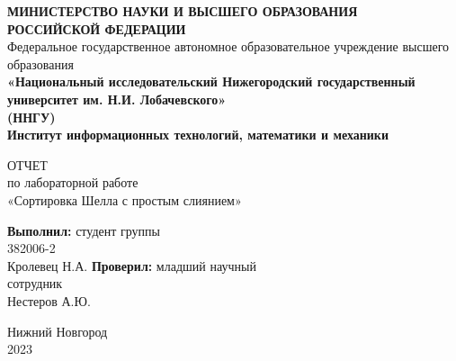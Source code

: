 \documentclass[14pt, a4paper]{extarticle}
\title{}
\author{}
\date{}
\begin{document}
	\begin{titlepage}
		\begin{center}
			{\bfseries МИНИСТЕРСТВО НАУКИ И ВЫСШЕГО ОБРАЗОВАНИЯ \\
				РОССИЙСКОЙ ФЕДЕРАЦИИ}
			\\
			Федеральное государственное автономное образовательное учреждение высшего образования
			\\
			{\bfseries «Национальный исследовательский Нижегородский государственный университет им. Н.И. Лобачевского»\\(ННГУ)
				\\Институт информационных технологий, математики и механики} \\
		\end{center}

		\vspace{8em}

		\begin{center}
			ОТЧЕТ \\ по лабораторной работе \\
			«Сортировка Шелла с простым слиянием»
		\end{center}

		\vspace{5em}


		\begin{flushright}
			{\bfseries Выполнил:} студент группы\\382006-2\\Кролевец Н.А. \underline{\hspace{3cm}} \linebreak\linebreak\linebreak
			{\bfseries Проверил:} младший научный\\сотрудник\\Нестеров А.Ю. \underline{\hspace{3cm}} 
		\end{flushright}


		\vspace{\fill}

		\begin{center}
			Нижний Новгород\\2023
		\end{center}

	\end{titlepage}

	\tableofcontents
	\thispagestyle{empty}
	\newpage

	\pagestyle{plain}
	\setcounter{page}{3}
\end{document}
